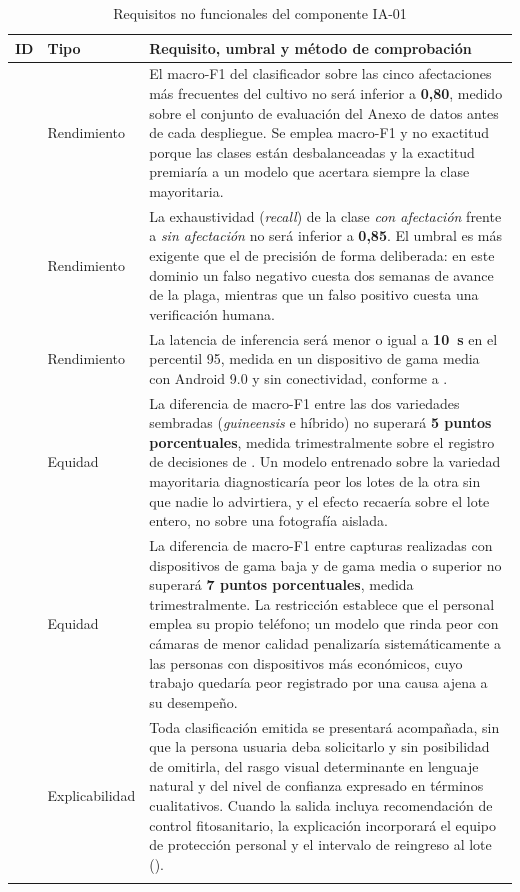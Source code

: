 \begin{longtable}{|C{2.1cm}|C{2.0cm}|L{11.2cm}|}
\hline
{}\textbf{ID} & \textbf{Tipo} & \textbf{Requisito, umbral y método de comprobación}\\ \hline
\endhead
{} & Rendimiento & El macro-F1 del clasificador sobre las cinco afectaciones más frecuentes del cultivo no será inferior a \textbf{0,80}, medido sobre el conjunto de evaluación del Anexo de datos antes de cada despliegue. Se emplea macro-F1 y no exactitud porque las clases están desbalanceadas y la exactitud premiaría a un modelo que acertara siempre la clase mayoritaria. \\ \hline
{} & Rendimiento & La exhaustividad (\emph{recall}) de la clase \emph{con afectación} frente a \emph{sin afectación} no será inferior a \textbf{0,85}. El umbral es más exigente que el de precisión de forma deliberada: en este dominio un falso negativo cuesta dos semanas de avance de la plaga, mientras que un falso positivo cuesta una verificación humana. \\ \hline
{} & Rendimiento & La latencia de inferencia será menor o igual a \textbf{10~s} en el percentil 95, medida en un dispositivo de gama media con Android 9.0 y sin conectividad, conforme a . \\ \hline
{} & Equidad & La diferencia de macro-F1 entre las dos variedades sembradas (\emph{guineensis} e híbrido) no superará \textbf{5 puntos porcentuales}, medida trimestralmente sobre el registro de decisiones de . Un modelo entrenado sobre la variedad mayoritaria diagnosticaría peor los lotes de la otra sin que nadie lo advirtiera, y el efecto recaería sobre el lote entero, no sobre una fotografía aislada. \\ \hline
{} & Equidad & La diferencia de macro-F1 entre capturas realizadas con dispositivos de gama baja y de gama media o superior no superará \textbf{7 puntos porcentuales}, medida trimestralmente. La restricción  establece que el personal emplea su propio teléfono; un modelo que rinda peor con cámaras de menor calidad penalizaría sistemáticamente a las personas con dispositivos más económicos, cuyo trabajo quedaría peor registrado por una causa ajena a su desempeño. \\ \hline
{} & Explicabilidad & Toda clasificación emitida se presentará acompañada, sin que la persona usuaria deba solicitarlo y sin posibilidad de omitirla, del rasgo visual determinante en lenguaje natural y del nivel de confianza expresado en términos cualitativos. Cuando la salida incluya recomendación de control fitosanitario, la explicación incorporará el equipo de protección personal y el intervalo de reingreso al lote (). \\ \hline
\caption{Requisitos no funcionales del componente IA-01}
\end{longtable}


